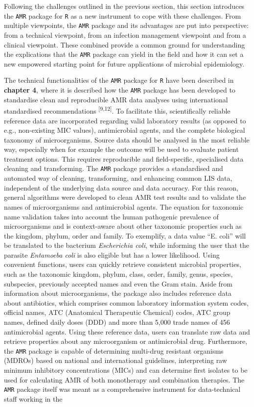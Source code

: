 \documentclass[
]{book}
\begin{document}
Following the challenges outlined in the previous section, this section introduces the \texttt{AMR} package for \texttt{R} as a new instrument to cope with these challenges. From multiple viewpoints, the \texttt{AMR} package and its advantages are put into perspective: from a technical viewpoint, from an infection management viewpoint and from a clinical viewpoint. These combined provide a common ground for understanding the explications that the \texttt{AMR} package can yield in the field and how it can set a new empowered starting point for future applications of microbial epidemiology.

The technical functionalities of the \texttt{AMR} package for \texttt{R} have been described in \textbf{chapter 4}, where it is described how the \texttt{AMR} package has been developed to standardise clean and reproducible AMR data analyses using international standardised recommendations \textsuperscript{{[}9,12{]}}. To facilitate this, scientifically reliable reference data are incorporated regarding valid laboratory results (as opposed to e.g., non-existing MIC values), antimicrobial agents, and the complete biological taxonomy of microorganisms. Source data should be analysed in the most reliable way, especially when for example the outcome will be used to evaluate patient treatment options. This requires reproducible and field-specific, specialised data cleaning and transforming. The \texttt{AMR} package provides a standardised and automated way of cleaning, transforming, and enhancing common LIS data, independent of the underlying data source and data accuracy. For this reason, general algorithms were developed to clean AMR test results and to validate the names of microorganisms and antimicrobial agents. The equation for taxonomic name validation takes into account the human pathogenic prevalence of microorganisms and is context-aware about other taxonomic properties such as the kingdom, phylum, order and family. To exemplify, a data value ``E. coli'' will be translated to the bacterium \emph{Escherichia coli}, while informing the user that the parasite \emph{Entamoeba coli} is also eligible but has a lower likelihood. Using convenient functions, users can quickly retrieve consistent microbial properties, such as the taxonomic kingdom, phylum, class, order, family, genus, species, subspecies, previously accepted names and even the Gram stain. Aside from information about microorganisms, the package also includes reference data about antibiotics, which comprises common laboratory information system codes, official names, ATC (Anatomical Therapeutic Chemical) codes, ATC group names, defined daily doses (DDD) and more than 5,000 trade names of 456 antimicrobial agents. Using these reference data, users can translate raw data and retrieve properties about any microorganism or antimicrobial drug. Furthermore, the \texttt{AMR} package is capable of determining multi-drug resistant organisms (MDROs) based on national and international guidelines, interpreting raw minimum inhibitory concentrations (MICs) and can determine first isolates to be used for calculating AMR of both monotherapy and combination therapies. The \texttt{AMR} package itself was meant as a comprehensive instrument for data-technical staff working in the 
\end{document}
